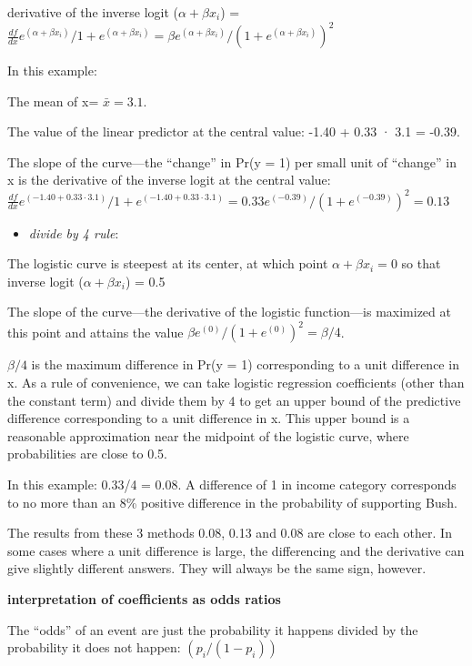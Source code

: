 \documentclass[
]{article}
\providecommand{\tightlist}{%
  \setlength{\itemsep}{0pt}\setlength{\parskip}{0pt}}
\begin{document}
derivative of the inverse logit (\(\alpha +\beta x_i\)) =
\(\frac{df}{dx} e^{(\alpha +\beta x_i)} / 1 + e^{(\alpha +\beta x_i)} = \beta e^{(\alpha +\beta x_i)}/(1 + e^{(\alpha +\beta x_i)})^2\)

In this example:

The mean of x= \(\bar{x}= 3.1\).

The value of the linear predictor at the central value: -1.40 + 0.33 ·
3.1 = -0.39.

The slope of the curve---the ``change'' in Pr(y = 1) per small unit of
``change'' in x is the derivative of the inverse logit at the central
value:
\(\frac{df}{dx} e^{(-1.40 + 0.33 · 3.1)} / 1 + e^{(-1.40 + 0.33 · 3.1)}= 0.33 e^{(-0.39)} / (1 + e^{(-0.39)})^2= 0.13\)

\begin{itemize}
\tightlist
\item
  \emph{divide by 4 rule}:
\end{itemize}

The logistic curve is steepest at its center, at which point
\(\alpha +\beta x_i = 0\) so that inverse logit (\(\alpha +\beta x_i\))
= 0.5

The slope of the curve---the derivative of the logistic function---is
maximized at this point and attains the value
\(\beta e^{(0)} / (1 + e^{(0)})^2= \beta/4\).

\(\beta/4\) is the maximum difference in Pr(y = 1) corresponding to a
unit difference in x. As a rule of convenience, we can take logistic
regression coefficients (other than the constant term) and divide them
by 4 to get an upper bound of the predictive difference corresponding to
a unit difference in x. This upper bound is a reasonable approximation
near the midpoint of the logistic curve, where probabilities are close
to 0.5.

In this example: 0.33/4 = 0.08. A difference of 1 in income category
corresponds to no more than an 8\% positive difference in the
probability of supporting Bush.

The results from these 3 methods 0.08, 0.13 and 0.08 are close to each
other. In some cases where a unit difference is large, the differencing
and the derivative can give slightly different answers. They will always
be the same sign, however.

\textbf{interpretation of coefficients as odds ratios}

The ``odds'' of an event are just the probability it happens divided by
the probability it does not happen: \((p_i/(1-p_i))\)
\end{document}
